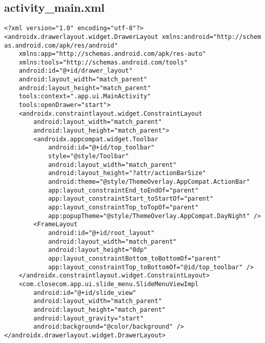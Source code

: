 \documentclass[listing]{espd}
\begin{document}
\subsection{activity\_main.xml}
\begin{verbatim}
<?xml version="1.0" encoding="utf-8"?>
<androidx.drawerlayout.widget.DrawerLayout xmlns:android="http://schem
as.android.com/apk/res/android"
    xmlns:app="http://schemas.android.com/apk/res-auto"
    xmlns:tools="http://schemas.android.com/tools"
    android:id="@+id/drawer_layout"
    android:layout_width="match_parent"
    android:layout_height="match_parent"
    tools:context=".app.ui.MainActivity"
    tools:openDrawer="start">
    <androidx.constraintlayout.widget.ConstraintLayout
        android:layout_width="match_parent"
        android:layout_height="match_parent">
        <androidx.appcompat.widget.Toolbar
            android:id="@+id/top_toolbar"
            style="@style/Toolbar"
            android:layout_width="match_parent"
            android:layout_height="?attr/actionBarSize"
            android:theme="@style/ThemeOverlay.AppCompat.ActionBar"
            app:layout_constraintEnd_toEndOf="parent"
            app:layout_constraintStart_toStartOf="parent"
            app:layout_constraintTop_toTopOf="parent"
            app:popupTheme="@style/ThemeOverlay.AppCompat.DayNight" />
        <FrameLayout
            android:id="@+id/root_layout"
            android:layout_width="match_parent"
            android:layout_height="0dp"
            app:layout_constraintBottom_toBottomOf="parent"
            app:layout_constraintTop_toBottomOf="@id/top_toolbar" />
    </androidx.constraintlayout.widget.ConstraintLayout>
    <com.closecom.app.ui.slide_menu.SlideMenuViewImpl
        android:id="@+id/slide_view"
        android:layout_width="match_parent"
        android:layout_height="match_parent"
        android:layout_gravity="start"
        android:background="@color/background" />
</androidx.drawerlayout.widget.DrawerLayout>
\end{verbatim}
\end{document}
